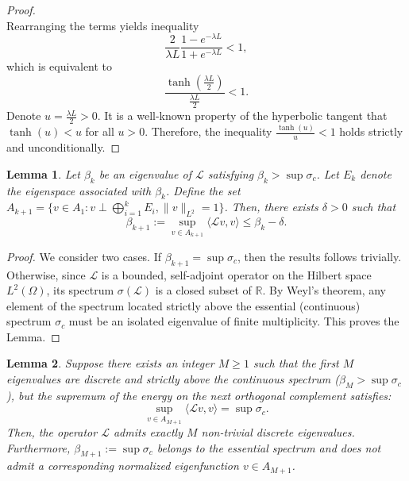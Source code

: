 \documentclass[11pt, a4paper]{article}
\theoremstyle{break}
\theoremstyle{break}
\theoremstyle{break}
\theoremstyle{break}
\theoremstyle{break}
\newtheorem{lem}{Lemma}[section]
\theoremstyle{break}
\theoremstyle{break}
\theoremstyle{break}
\theoremstyle{break}
\begin{document}
\begin{proof}
\begin{equation}
    \end{equation}
    Rearranging the terms yields inequality
    \begin{equation}
        \frac{2}{\lambda L} \frac{1 - e^{-\lambda L}}{1 + e^{-\lambda L}} < 1,
    \end{equation}
    which is equivalent to
    \begin{equation}
        \frac{\tanh\left(\frac{\lambda L}{2}\right)}{\frac{\lambda L}{2}} < 1.
    \end{equation}
    Denote $u = \frac{\lambda L}{2} > 0$. It is a well-known property of the hyperbolic tangent that $\tanh(u) < u$ for all $u > 0$. Therefore, the inequality $\frac{\tanh(u)}{u} < 1$ holds strictly and unconditionally.
\end{proof}

\begin{lem}
    \label{lem:strict_separation}
    Let $\beta_k$ be an eigenvalue of $\mathcal{L}$ satisfying $\beta_k > \sup \sigma_c$. Let $E_k$ denote the eigenspace associated with $\beta_k$. Define the set $A_{k+1} = \{v \in A_1 : v \perp \bigoplus_{i=1}^k E_i, \|v\|_{L^2} = 1\}$. 
    Then, there exists $\delta > 0$ such that
    \begin{equation}
        \beta_{k+1} := \sup_{v \in A_{k+1}} \langle \mathcal{L}v, v \rangle \leq \beta_k - \delta.
    \end{equation}
\end{lem}

\begin{proof}
We consider two cases. If $\beta_{k+1} = \sup \sigma_c$, then the results follows trivially. Otherwise, since $\mathcal{L}$ is a bounded, self-adjoint operator on the Hilbert space $L^2(\Omega)$, its spectrum $\sigma(\mathcal{L})$ is a closed subset of $\mathbb{R}$. By Weyl's theorem, any element of the spectrum located strictly above the essential (continuous) spectrum $\sigma_c$ must be an isolated eigenvalue of finite multiplicity. This proves the Lemma.
\end{proof}

\begin{lem}
    \label{lem:termination}
    Suppose there exists an integer $M \geq 1$ such that the first $M$ eigenvalues are discrete and strictly above the continuous spectrum ($\beta_M > \sup \sigma_c$), but the supremum of the energy on the next orthogonal complement satisfies:
    \begin{equation}
        \sup_{v \in A_{M+1}} \langle \mathcal{L}v, v \rangle = \sup \sigma_c.
    \end{equation}
    Then, the operator $\mathcal{L}$ admits exactly $M$ non-trivial discrete eigenvalues. Furthermore, $\beta_{M+1} := \sup \sigma_c$ belongs to the essential spectrum and does not admit a corresponding normalized eigenfunction $v \in A_{M+1}$.
\end{lem}
\end{document}
